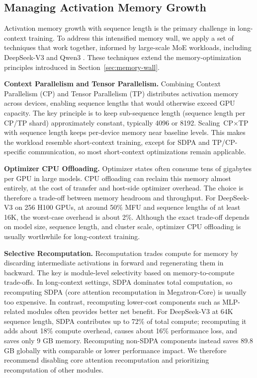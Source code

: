 \documentclass[10pt,logo,copyright]{nvidiatechreport}
\begin{document}
\subsection{Managing Activation Memory Growth}

Activation memory growth with sequence length is the primary challenge in long-context training. To address this intensified memory wall, we apply a set of techniques that work together, informed by large-scale MoE workloads, including DeepSeek-V3 \cite{deepseekai2025deepseekv3technicalreport} and Qwen3 \cite{yang2025qwen3technicalreport}. These techniques extend the memory-optimization principles introduced in Section~\ref{sec:memory-wall}.

\textbf{Context Parallelism and Tensor Parallelism.}
Combining Context Parallelism (CP) and Tensor Parallelism (TP) distributes activation memory across devices, enabling sequence lengths that would otherwise exceed GPU capacity. The key principle is to keep sub-sequence length (sequence length per CP/TP shard) approximately constant, typically 4096 or 8192. Scaling $\text{CP} \times \text{TP}$ with sequence length keeps per-device memory near baseline levels. This makes the workload resemble short-context training, except for SDPA and TP/CP-specific communication, so most short-context optimizations remain applicable.

\textbf{Optimizer CPU Offloading.}
Optimizer states often consume tens of gigabytes per GPU in large models. CPU offloading can reclaim this memory almost entirely, at the cost of transfer and host-side optimizer overhead. The choice is therefore a trade-off between memory headroom and throughput. For DeepSeek-V3 on 256 H100 GPUs, at around 50\% MFU and sequence lengths of at least 16K, the worst-case overhead is about 2\%. Although the exact trade-off depends on model size, sequence length, and cluster scale, optimizer CPU offloading is usually worthwhile for long-context training.

\textbf{Selective Recomputation.}
Recomputation trades compute for memory by discarding intermediate activations in forward and regenerating them in backward. The key is module-level selectivity based on memory-to-compute trade-offs. In long-context settings, SDPA dominates total computation, so recomputing SDPA (core attention recomputation in Megatron-Core) is usually too expensive. In contrast, recomputing lower-cost components such as MLP-related modules often provides better net benefit. For DeepSeek-V3 at 64K sequence length, SDPA contributes up to 72\% of total compute; recomputing it adds about 18\% compute overhead, causes about 16\% performance loss, and saves only 9 GB memory. Recomputing non-SDPA components instead saves 89.8 GB globally with comparable or lower performance impact. We therefore recommend disabling core attention recomputation and prioritizing recomputation of other modules.
\end{document}
